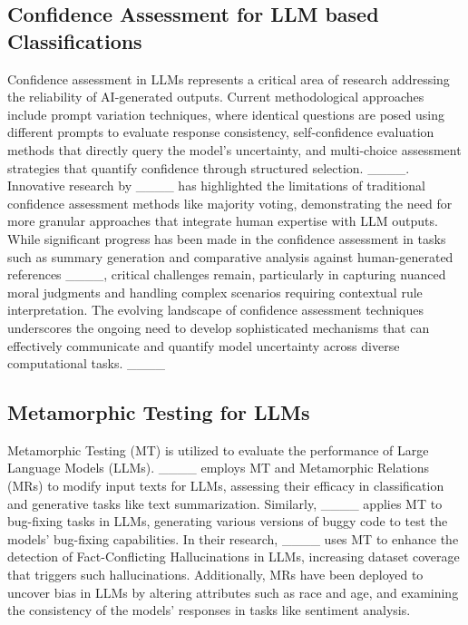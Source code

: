 \subsection{Confidence Assessment for LLM based Classifications}
Confidence assessment in LLMs represents a critical area of research addressing the reliability of AI-generated outputs. Current methodological approaches include prompt variation techniques, where identical questions are posed using different prompts to evaluate response consistency, self-confidence evaluation methods that directly query the model's uncertainty, and multi-choice assessment strategies that quantify confidence through structured selection. ____. Innovative research by ____ has highlighted the limitations of traditional confidence assessment methods like majority voting, demonstrating the need for more granular approaches that integrate human expertise with LLM outputs. While significant progress has been made in the confidence assessment in tasks such as summary generation and comparative analysis against human-generated references ____, 
critical challenges remain, particularly in capturing nuanced moral judgments and handling complex scenarios requiring contextual rule interpretation. The evolving landscape of confidence assessment techniques underscores the ongoing need to develop sophisticated mechanisms that can effectively communicate and quantify model uncertainty across diverse computational tasks. ____


\subsection{Metamorphic Testing for LLMs}
Metamorphic Testing (MT) is utilized to evaluate the performance of Large Language Models (LLMs). ____ employs MT and Metamorphic Relations (MRs) to modify input texts for LLMs, assessing their efficacy in classification and generative tasks like text summarization. Similarly, ____ applies MT to bug-fixing tasks in LLMs, generating various versions of buggy code to test the models' bug-fixing capabilities. In their research, ____ uses MT to enhance the detection of Fact-Conflicting Hallucinations in LLMs, increasing dataset coverage that triggers such hallucinations. Additionally, MRs have been deployed to uncover bias in LLMs by altering attributes such as race and age, and examining the consistency of the models' responses in tasks like sentiment analysis.